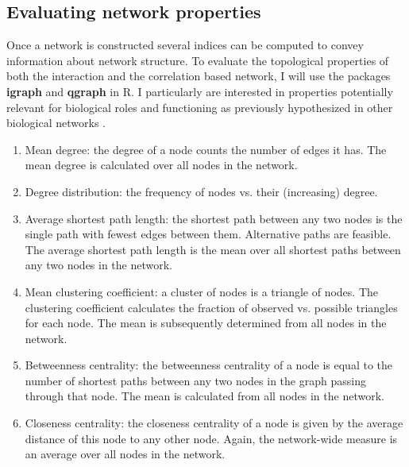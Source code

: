 \subsection*{Evaluating network properties}
Once a network is constructed several indices can be computed to convey information about network structure. To evaluate the topological properties of both the interaction and the correlation based network, I will use the packages \textbf{igraph} and \textbf{qgraph} in R. I particularly are interested in properties potentially relevant for biological roles and functioning as previously hypothesized in other biological networks .

\begin{enumerate}
\item Mean degree: the degree of a node counts the number of edges it has. The mean degree is calculated over all nodes in the network.
\item Degree distribution: the frequency of nodes vs. their (increasing) degree.
\item Average shortest path length: the shortest path between any two nodes is the single path with fewest edges between them. Alternative paths are feasible. The average shortest path length is the mean over all shortest paths between any two nodes in the network.
\item Mean clustering coefficient: a cluster of nodes is a triangle of nodes. The clustering coefficient calculates the fraction of observed vs. possible triangles for each node. The mean is subsequently determined from all nodes in the network.
\item Betweenness centrality: the betweenness centrality of a node is equal to the number of shortest paths between any two nodes in the graph passing through that node. The mean is calculated from all nodes in the network.
\item Closeness centrality: the closeness centrality of a node is given by the average distance of this node to any other node. Again, the network-wide measure is an average over all nodes in the network.
\end{enumerate}

